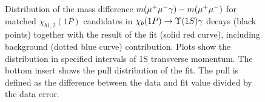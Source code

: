 \begin{figure}[H]
{\begin{picture}
  \end{picture}
  }
  \caption {\small 
    Distribution of the mass difference $m(\mumu\gamma) - m(\mumu)$ for matched
    $\chi_{b1,2}(1P)$ candidates in $\chibOneP \to \Y1S \gamma$ decays
    (black points) together with the result of the fit (solid red curve),
    including background (dotted blue curve) contribution. Plots show the
    distribution in specified intervals of \Y1S transverse momentum. The bottom
    insert shows the  pull distribution of the fit. The pull is defined as the
    difference  between the data and fit value divided by the data error. }
  \label{fig:mc:ups1s:fits1p}
\end{figure}


